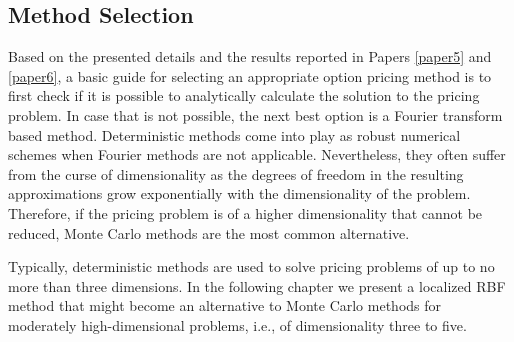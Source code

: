 \documentclass{UUThesisTemplate}
\begin{document}
\subsection{Method Selection}
\par Based on the presented details and the results reported in Papers \ref{paper5} and \ref{paper6}, a basic guide for selecting an appropriate option pricing method is to first check if it is possible to analytically calculate the solution to the pricing problem. In case that is not possible, the next best option is a Fourier transform based method. Deterministic methods come into play as robust numerical schemes when Fourier methods are not applicable. Nevertheless, they often suffer from the curse of dimensionality as the degrees of freedom in the resulting approximations grow exponentially with the dimensionality of the problem. Therefore, if the pricing problem is of a higher dimensionality that cannot be reduced, Monte Carlo methods are the most common alternative.
\par Typically, deterministic methods are used to solve pricing problems of up to no more than three dimensions. In the following chapter we present a localized RBF method that might become an alternative to Monte Carlo methods for moderately high-dimensional problems, i.e., of dimensionality three to five. 
%
%
\end{document}
